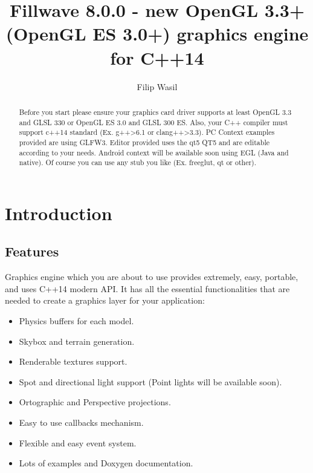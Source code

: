 \documentclass{article}
\begin{document}
\title{\textbf{Fillwave 8.0.0}
 - new OpenGL 3.3+ (OpenGL ES 3.0+) graphics engine for C++14 }
\author{Filip Wasil}

\maketitle

\begin{abstract}
Before you start please ensure your graphics card driver supports at least OpenGL 3.3 and GLSL 330 or OpenGL ES 3.0 and GLSL 300 ES. Also, your C++ compiler must support c++14 standard (Ex. g++\textgreater6.1 or clang++\textgreater3.3). PC Context examples provided are using GLFW3. Editor provided uses the qt5 QT5 and are editable according to your needs. Android context will be available soon using EGL (Java and native). Of course you can use any stub you like (Ex. freeglut, qt or other).
\end{abstract}

\pagebreak
\tableofcontents

\newpage

\section{Introduction}
\subsection{Features}\label{sec:Features}
\indent \indent Graphics engine which you are about to use provides extremely, easy, portable, and uses C++14 modern API. It has all the essential functionalities that are needed to create a graphics layer for your application:

\begin{itemize}
  \item Physics buffers for each model.
  \item Skybox and terrain generation.
  \item Renderable textures support.
  \item Spot and directional light support (Point lights will be available soon).
  \item Ortographic and Perspective projections.
  \item Easy to use callbacks mechanism.
  \item Flexible and easy event system.
  \item Lots of examples and Doxygen documentation.
\end{itemize}
\end{document}
